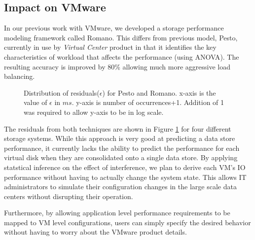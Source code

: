 \subsection{Impact on VMware}
%
In our previous work with VMware, we developed a storage performance modeling framework called Romano. 
This differs from previous model, Pesto\cite{}, currently in use by \emph{Virtual Center} product in that it identifies the key characteristics of workload that affects the performance (using ANOVA\cite{}).
The resulting accuracy is improved by 80\% allowing much more aggressive load balancing. 
\begin{figure}[t!]
\centering
{}
\caption{Distribution of residuals($\epsilon$) for Pesto and Romano.
x-axis is the value of $\epsilon$ in $ms$.
y-axis is number of occurrences+1.
Addition of 1 was required to allow y-axis to be in log scale.
}
\label{residualDist}
\end{figure}
The residuals from both techniques are shown in Figure \ref{residualDist} for four different storage systems.
While this approach is very good at predicting a data store performance, it currently lacks the ability to predict the performance for each virtual disk when they are consolidated onto a single data store. 
By applying statstical inference on the effect of interference, we plan to derive each VM's IO performance without having to actually change the system state. 
This allows IT administrators to simulate their configuration changes in the large scale data centers without disrupting their operation. 

Furthermore, by allowing application level performance requirements to be mapped to VM level configurations, users can simply specify the desired behavior without having to worry about the VMware product details. 

